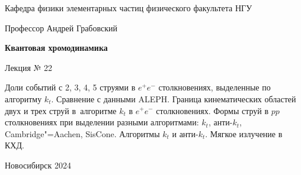 \documentclass[12pt,pagesize,paper=landscape,paper=192mm:108mm]{scrbook}
\begin{document}
\begin{titlepage}
\begin{center}
    Кафедра физики элементарных частиц физического факультета НГУ
    \medskip

    \Large
    Профессор Андрей Грабовский
    
    \bigskip

    \huge
    \textbf{Квантовая хромодинамика}
    \medskip

    \Large
    Лекция № 22
    \vfill

    \normalsize
    \begin{minipage}{0.85\linewidth}
      Доли событий с 2, 3, 4, 5 струями в $e^+e^-$ столкновениях,
      выделенные по алгоритму $k_t$. Сравнение с данными ALEPH. Граница
      кинематических областей двух и трех струй в~алгоритме $k_t$ в $e^+e^-$
      столкновениях. Формы струй в $pp$ столкновениях при выделении
      разными алгоритмами: $k_t$, анти-$k_t$, Cambridge"=Aachen,
      SisCone. Алгоритмы $k_t$ и анти-$k_t$. Мягкое излучение в КХД.
    \end{minipage}
    \vfill

    \normalsize \ccbysa\hspace{0.5em}  Новосибирск 2024
  \end{center}
\end{titlepage}
\end{document}
